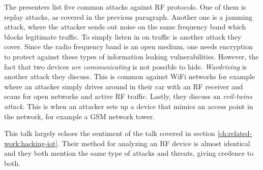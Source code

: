 The presenters list five common attacks against RF protocols. One of them is replay attacks, as covered in the previous paragraph. Another one is a jamming attack, where the attacker sends out noise on the same frequency band which blocks legitimate traffic. To simply listen in on traffic is another attack they cover. Since the radio frequency band is an open medium, one needs encryption to protect against these types of information leaking vulnerabilities. However, the fact that two devices \textit{are communicating} is not possible to hide. \textit{Wardriving} is another attack they discuss. This is common against WiFi networks for example where an attacker simply drives around in their car with an RF receiver and scans for open networks and active RF traffic. Lastly, they discuss an \textit{evil-twins attack}. This is when an attacker sets up a device that mimics an access point in the network, for example a GSM network tower.

This talk largely echoes the sentiment of the talk covered in section \ref{ch:related-work:hacking-iot}. Their method for analyzing an RF device is almost identical and they both mention the same type of attacks and threats, giving credence to both.
